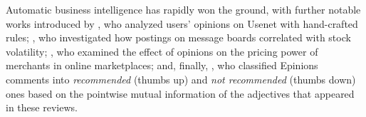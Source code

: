 Automatic business intelligence has rapidly won the ground, with
further notable works introduced by \citet{Glance:05}, who analyzed
users' opinions on Usenet with hand-crafted rules;
\citet{Antweiler:04}, who investigated how postings on message boards
correlated with stock volatility; \citet{Ghose:07}, who examined the
effect of opinions on the pricing power of merchants in online
marketplaces; and, finally, \citet{Turney:02}, who classified Epinions
comments into \emph{recommended} (thumbs up) and \emph{not
  recommended} (thumbs down) ones based on the pointwise mutual
information of the adjectives that appeared in these reviews.



